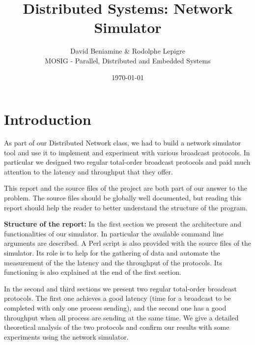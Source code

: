 \documentclass[a4paper]{article}
\begin{document}
\title{Distributed Systems: Network Simulator}
\author{David Beniamine \& Rodolphe Lepigre\\ MOSIG - Parallel, Distributed and Embedded Systems}

\date{\today}
\maketitle%
\begin{center}
    \tableofcontents%
\end{center}
\newpage%



\section*{Introduction}
As part of our Distributed Network class, we had to build a network simulator
tool and use it to implement and experiment with various broadcast protocols.
In particular we designed two regular total-order broadcast protocols and paid
much attention to the latency and throughput that they offer.

This report and the source files of the project are both part of our answer to
the problem. The source files should be globally well documented, but reading
this report should help the reader to better understand the structure of the
program.
\bigskip

\noindent\textbf{Structure of the report:} In the first section we present the
architecture and functionalities of our simulator. In particular the available
command line arguments are described. A Perl script is also provided with the
source files of the simulator. Its role is to help for the gathering of data
and automate the measurement of the the latency and the throughput of the
protocols. Its functioning is also explained at the end of the first section.

In the second and third sections we present two regular total-order broadcast
protocols. The first one achieves a good latency (time for a broadcast to be
completed with only one process sending), and the second one has a good
throughput when all process are sending at the same time. We give a detailed
theoretical analysis of the two protocols and confirm our results with some
experiments using the network simulator.
\end{document}
